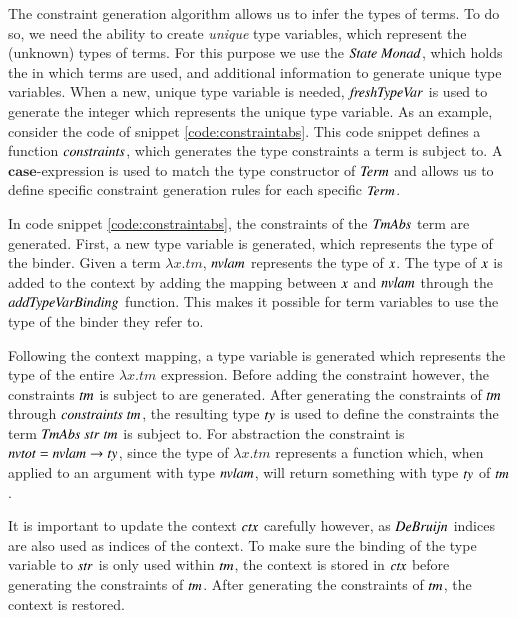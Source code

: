 The constraint generation algorithm allows us to infer the types of terms.
To do so, we need the ability to create \textit{unique} type variables, which represent the (unknown) types of terms.
For this purpose we use the \ensuremath{\Conid{State}\;\Conid{Monad}}, which holds the in which terms are used, and additional information to generate unique type variables.
When a new, unique type variable is needed, \ensuremath{\Varid{freshTypeVar}} is used to generate the integer which represents the unique type variable.
As an example, consider the code of snippet \ref{code:constraintabs}.
This code snippet defines a function \ensuremath{\Varid{constraints}}, which generates the type constraints a term is subject to.
A \ensuremath{\mathbf{case}}-expression is used to match the type constructor of \ensuremath{\Conid{Term}} and allows us to define specific constraint generation rules for each specific \ensuremath{\Conid{Term}}.

In code snippet \ref{code:constraintabs}, the constraints of the \ensuremath{\Conid{TmAbs}} term are generated.
First, a new type variable is generated, which represents the type of the binder.
Given a term $\lambda x.tm$, \ensuremath{\Varid{nvlam}} represents the type of \ensuremath{\Varid{x}}.
The type of \ensuremath{\Varid{x}} is added to the context by adding the mapping between \ensuremath{\Varid{x}} and \ensuremath{\Varid{nvlam}} through the \ensuremath{\Varid{addTypeVarBinding}} function.
This makes it possible for term variables to use the type of the binder they refer to.

Following the context mapping, a type variable is generated which represents the type of the entire $\lambda x.tm$ expression.
Before adding the constraint however, the constraints \ensuremath{\Varid{tm}} is subject to are generated.
After generating the constraints of \ensuremath{\Varid{tm}} through \ensuremath{\Varid{constraints}\;\Varid{tm}}, the resulting type \ensuremath{\Varid{ty}} is used to define the constraints the term \ensuremath{\Conid{TmAbs}\;\Varid{str}\;\Varid{tm}} is subject to.
For abstraction the constraint is \ensuremath{\Varid{nvtot}\mathrel{=}\Varid{nvlam}\to \Varid{ty}}, since the type of $\lambda x.tm$ represents a function which, when applied to an argument with type \ensuremath{\Varid{nvlam}}, will return something with type \ensuremath{\Varid{ty}} of \ensuremath{\Varid{tm}}.

It is important to update the context \ensuremath{\Varid{ctx}} carefully however, as \ensuremath{\Conid{DeBruijn}} indices are also used as indices of the context.
To make sure the binding of the type variable to \ensuremath{\Varid{str}} is only used within \ensuremath{\Varid{tm}}, the context is stored in \ensuremath{\Varid{ctx}} before generating the constraints of \ensuremath{\Varid{tm}}.
After generating the constraints of \ensuremath{\Varid{tm}}, the context is restored.

